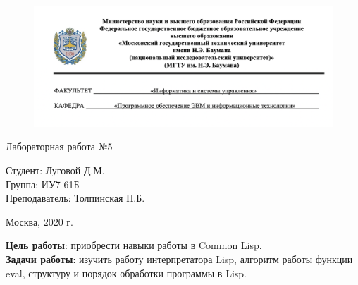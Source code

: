 


	
\begin{figure}[h!]
	\begin{center}
		{\includegraphics[width = \textwidth]{titul.png}}
	\end{center}
\end{figure}

\vspace*{20mm}

\huge
\begin{center}
	Лабораторная работа №5
\end{center}


\vspace*{50mm}

\large
\begin{flushleft}
	Студент: Луговой Д.М. \\
	Группа: ИУ7-61Б \\
	Преподаватель: Толпинская Н.Б.
\end{flushleft}

\vspace*{60mm}

\large
\begin{center}
	Москва, 2020 г.
\end{center}

\thispagestyle{empty}

\newpage
\vspace*{10mm}
\textbf{Цель работы}: приобрести навыки работы в Common Lisp.\\

\textbf{Задачи работы}: изучить работу интерпретатора Lisp, алгоритм работы функции eval, структуру и порядок обработки программы в Lisp.

